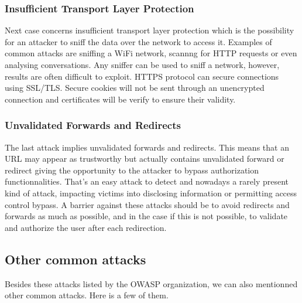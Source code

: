 \subsubsection{Insufficient Transport Layer Protection}
Next case concerns insufficient transport layer protection which is the
possibility for an attacker to sniff the data over the network to access it.
Examples of common attacks are sniffing a WiFi network, scannng for HTTP
requests or even analysing conversations. Any sniffer can be used to sniff a
network, however, results are often difficult to exploit. HTTPS protocol can
secure connections using SSL/TLS. Secure cookies will not be sent through an
unencrypted connection and certificates will be verify to ensure their validity.

\subsubsection{Unvalidated Forwards and Redirects}
The last attack implies unvalidated forwards and redirects. This means that an
URL may appear as trustworthy but actually contains unvalidated forward or
redirect giving the opportunity to the attacker to bypass authorization
functionnalities. That's an easy attack to detect and nowadays a rarely present
kind of attack, impacting victims into disclosing information or permitting
access control bypass. A barrier against these attacks should be to avoid
redirects and forwards as much as possible, and in the case if this is not
possible, to validate and authorize the user after each redirection.

\subsection{Other common attacks}
Besides these attacks listed by the OWASP organization, we can also mentionned
other common attacks. Here is a few of them.

